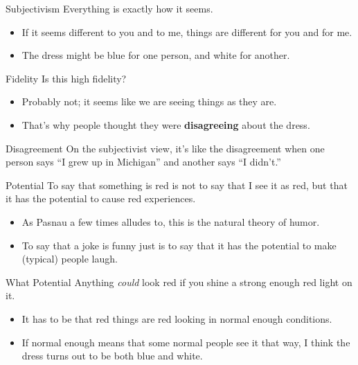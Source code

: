 \documentclass[
  17pt,
  letterpaper,
  ignorenonframetext,
  aspectratio=169,
  handout]{beamer}
\providecommand{\tightlist}{%
  \setlength{\itemsep}{0pt}\setlength{\parskip}{0pt}}\usepackage{longtable,booktabs,array}
\begin{document}
\begin{frame}{Subjectivism}
\protect\hypertarget{subjectivism}{}
Everything is exactly how it seems.

\begin{itemize}[<+->]
\tightlist
\item
  If it seems different to you and to me, things are different for you
  and for me.
\item
  The dress might be blue for one person, and white for another.
\end{itemize}
\end{frame}

\begin{frame}{Fidelity}
\protect\hypertarget{fidelity}{}
Is this high fidelity?

\begin{itemize}[<+->]
\tightlist
\item
  Probably not; it seems like we are seeing things as they are.
\item
  That's why people thought they were \textbf{disagreeing} about the
  dress.
\end{itemize}
\end{frame}

\begin{frame}{Disagreement}
\protect\hypertarget{disagreement}{}
On the subjectivist view, it's like the disagreement when one person
says ``I grew up in Michigan'' and another says ``I didn't.''
\end{frame}

\begin{frame}{Potential}
\protect\hypertarget{potential}{}
To say that something is red is not to say that I see it as red, but
that it has the potential to cause red experiences.

\begin{itemize}[<+->]
\tightlist
\item
  As Pasnau a few times alludes to, this is the natural theory of humor.
\item
  To say that a joke is funny just is to say that it has the potential
  to make (typical) people laugh.
\end{itemize}
\end{frame}

\begin{frame}{What Potential}
\protect\hypertarget{what-potential}{}
Anything \emph{could} look red if you shine a strong enough red light on
it.

\begin{itemize}[<+->]
\tightlist
\item
  It has to be that red things are red looking in normal enough
  conditions.
\item
  If normal enough means that some normal people see it that way, I
  think the dress turns out to be both blue and white.
\end{itemize}
\end{frame}
\end{document}
